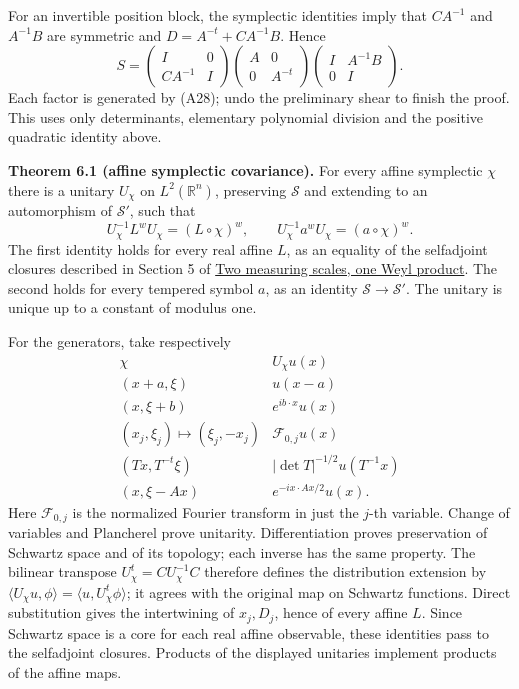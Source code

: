 \documentclass[
  11pt,
]{article}
\begin{document}
For an invertible position block, the symplectic identities imply that
\(CA^{-1}\) and \(A^{-1}B\) are symmetric and \(D=A^{-t}+CA^{-1}B\).
Hence \[
S=
\begin{pmatrix}I&0\\ CA^{-1}&I\end{pmatrix}
\begin{pmatrix}A&0\\0&A^{-t}\end{pmatrix}
\begin{pmatrix}I&A^{-1}B\\0&I\end{pmatrix}.
\tag{A29}
\] Each factor is generated by (A28); undo the preliminary shear to
finish the proof. This uses only determinants, elementary polynomial
division and the positive quadratic identity above.

\textbf{Theorem 6.1 (affine symplectic covariance).} For every affine
symplectic \(\chi\) there is a unitary \(U_\chi\) on
\(L^2(\mathbb R^n)\), preserving \(\mathcal S\) and extending to an
automorphism of \(\mathcal S'\), such that \[
U_\chi^{-1}L^wU_\chi=(L\circ\chi)^w,\qquad
U_\chi^{-1}a^wU_\chi=(a\circ\chi)^w.
\tag{A30}
\] The first identity holds for every real affine \(L\), as an equality
of the selfadjoint closures described in Section 5 of
\href{weyl-metric-products.pdf}{Two measuring scales, one Weyl product}.
The second holds for every tempered symbol \(a\), as an identity
\(\mathcal S\to\mathcal S'\). The unitary is unique up to a constant of
modulus one.

For the generators, take respectively \[
\begin{array}{c|c}
\chi& U_\chi u(x)\\ \hline
(x+a,\xi)&u(x-a)\\
(x,\xi+b)&e^{ib\cdot x}u(x)\\
(x_j,\xi_j)\mapsto(\xi_j,-x_j)&\mathcal F_{0,j}u(x)\\
(Tx,T^{-t}\xi)&|\det T|^{-1/2}u(T^{-1}x)\\
(x,\xi-Ax)&e^{-ix\cdot Ax/2}u(x).
\end{array}
\tag{A31}
\] Here \(\mathcal F_{0,j}\) is the normalized Fourier transform in just
the \(j\)-th variable. Change of variables and Plancherel prove
unitarity. Differentiation proves preservation of Schwartz space and of
its topology; each inverse has the same property. The bilinear transpose
\(U_\chi^t=CU_\chi^{-1}C\) therefore defines the distribution extension
by \(\langle U_\chi u,\phi\rangle=\langle u,U_\chi^t\phi\rangle\); it
agrees with the original map on Schwartz functions. Direct substitution
gives the intertwining of \(x_j,D_j\), hence of every affine \(L\).
Since Schwartz space is a core for each real affine observable, these
identities pass to the selfadjoint closures. Products of the displayed
unitaries implement products of the affine maps.
\end{document}
